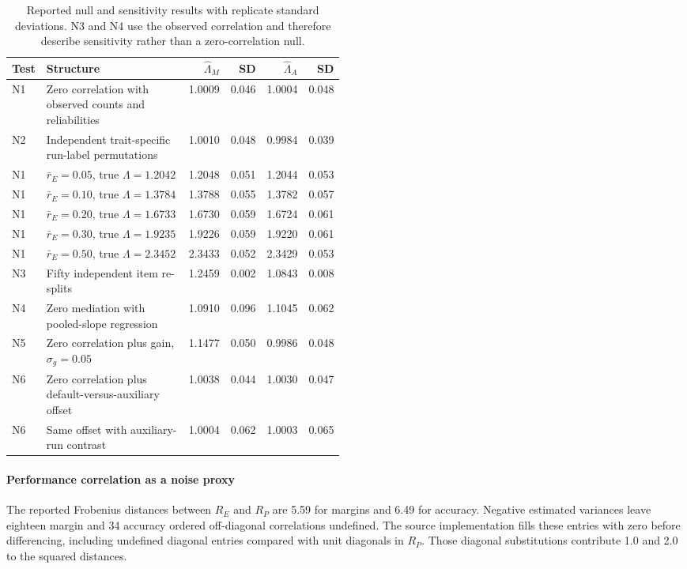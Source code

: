 \begin{table}[htbp]
\centering\scriptsize
\caption{Reported null and sensitivity results with replicate standard deviations. N3 and N4 use the observed correlation and therefore describe sensitivity rather than a zero-correlation null.}
\label{tab:original9}
\begin{tabular}{lp{0.49\linewidth}rrrr}\hline
Test & Structure & $\widehat\Lambda_M$ & SD & $\widehat\Lambda_A$ & SD\\\hline
N1 & Zero correlation with observed counts and reliabilities & 1.0009 & 0.046 & 1.0004 & 0.048\\
N2 & Independent trait-specific run-label permutations & 1.0010 & 0.048 & 0.9984 & 0.039\\
N1 & $\bar r_E=0.05$, true $\Lambda=1.2042$ & 1.2048 & 0.051 & 1.2044 & 0.053\\
N1 & $\bar r_E=0.10$, true $\Lambda=1.3784$ & 1.3788 & 0.055 & 1.3782 & 0.057\\
N1 & $\bar r_E=0.20$, true $\Lambda=1.6733$ & 1.6730 & 0.059 & 1.6724 & 0.061\\
N1 & $\bar r_E=0.30$, true $\Lambda=1.9235$ & 1.9226 & 0.059 & 1.9220 & 0.061\\
N1 & $\bar r_E=0.50$, true $\Lambda=2.3452$ & 2.3433 & 0.052 & 2.3429 & 0.053\\
N3 & Fifty independent item re-splits & 1.2459 & 0.002 & 1.0843 & 0.008\\
N4 & Zero mediation with pooled-slope regression & 1.0910 & 0.096 & 1.1045 & 0.062\\
N5 & Zero correlation plus gain, $\sigma_g=0.05$ & 1.1477 & 0.050 & 0.9986 & 0.048\\
N6 & Zero correlation plus default-versus-auxiliary offset & 1.0038 & 0.044 & 1.0030 & 0.047\\
N6 & Same offset with auxiliary-run contrast & 1.0004 & 0.062 & 1.0003 & 0.065\\\hline
\end{tabular}
\end{table}

\paragraph{Performance correlation as a noise proxy}
The reported Frobenius distances between $R_E$ and $R_P$ are 5.59 for margins and 6.49 for accuracy. Negative estimated variances leave eighteen margin and 34 accuracy ordered off-diagonal correlations undefined. The source implementation fills these entries with zero before differencing, including undefined diagonal entries compared with unit diagonals in $R_P$. Those diagonal substitutions contribute 1.0 and 2.0 to the squared distances.

